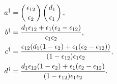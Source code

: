 
\begin{align}
	a^{\dagger} &= \left(\frac{\epsilon_{12}}{\epsilon_2}\right) \left(\frac{d_1}{\epsilon_1}\right), \\
	b^{\dagger} &= \frac{d_1\epsilon_{12} + \epsilon_1(\epsilon_2 - \epsilon_{12})}{\epsilon_1\epsilon_2}, \\	
	c^{\dagger} &= \frac{\epsilon_{12} (d_1 (1 - \epsilon_2) + \epsilon_1(\epsilon_2 - \epsilon_{12}))}{(1 - \epsilon_{12})\epsilon_1 \epsilon_2},\\
	d^{\dagger} &= \frac{d_1\epsilon_{12}(1 - \epsilon_2) + \epsilon_1(\epsilon_2 - \epsilon_{12})}{(1 - \epsilon_{12}) \epsilon_1 \epsilon_2}.
\end{align}


